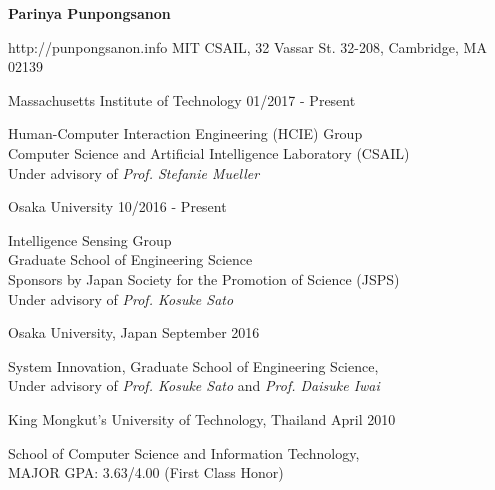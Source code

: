 \documentclass[11pt]{article} %
\begin{document}
{{\Huge \bf Parinya Punpongsanon}}
\smallskip

        {http://punpongsanon.info}
        {MIT CSAIL, 32 Vassar St. 32-208, Cambridge, MA 02139}


\begin{description}
	\squish
	{Massachusetts Institute of Technology}
	{01/2017 - Present}
	
	Human-Computer Interaction Engineering (HCIE) Group\\
	Computer Science and Artificial Intelligence Laboratory (CSAIL)\\
	Under advisory of \textit{Prof. Stefanie Mueller}
	
	{Osaka University}
	{10/2016 - Present}
	
	Intelligence Sensing Group\\
	Graduate School of Engineering Science\\
	Sponsors by Japan Society for the Promotion of Science (JSPS)\\
	Under advisory of \textit{Prof. Kosuke Sato}
	
\end{description}


\begin{description}
	\squish
	{Osaka University, Japan}
	{September 2016}
	
	System Innovation, Graduate School of Engineering Science,\\
	Under advisory of \textit{Prof. Kosuke Sato} and \textit{Prof. Daisuke Iwai}
	
	{King Mongkut's University of Technology, Thailand}
	{April 2010}
	
	School of Computer Science and Information Technology,\\
	MAJOR GPA: 3.63/4.00 (First Class Honor)
	
\end{description}

\end{document}
